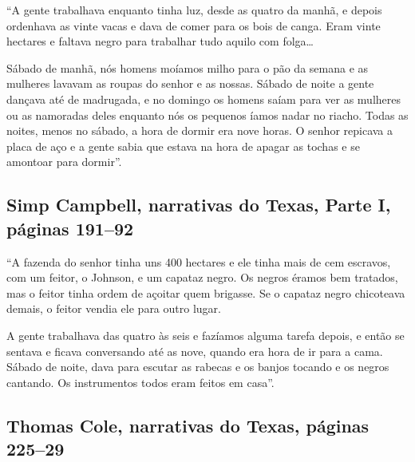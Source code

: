 ``A gente trabalhava enquanto tinha luz, desde as quatro da manhã, e
depois ordenhava as vinte vacas e dava de comer para os bois de canga.
Eram vinte hectares e faltava negro para trabalhar tudo aquilo com
folga\ldots{}

Sábado de manhã, nós homens moíamos milho para o pão da semana e as
mulheres lavavam as roupas do senhor e as nossas. Sábado de noite a
gente dançava até de madrugada, e no domingo os homens saíam para ver as
mulheres ou as namoradas deles enquanto nós os pequenos íamos nadar no
riacho. Todas as noites, menos no sábado, a hora de dormir era nove
horas. O senhor repicava a placa de aço e a gente sabia que estava na
hora de apagar as tochas e se amontoar para dormir''.

\subsection{Simp Campbell, narrativas do Texas, Parte I, páginas 191--92} \label{ref44}

``A fazenda do senhor tinha uns 400 hectares e ele tinha mais de cem
escravos, com um feitor, o Johnson, e um capataz negro. Os negros éramos
bem tratados, mas o feitor tinha ordem de açoitar quem brigasse. Se o
capataz negro chicoteava demais, o feitor vendia ele para outro lugar.

A gente trabalhava das quatro às seis e fazíamos alguma tarefa depois, e
então se sentava e ficava conversando até as nove, quando era hora de ir
para a cama. Sábado de noite, dava para escutar as rabecas e os banjos
tocando e os negros cantando. Os instrumentos todos eram feitos em
casa''.

\subsection{Thomas Cole, narrativas do Texas, páginas 225--29} \label{ref55}

